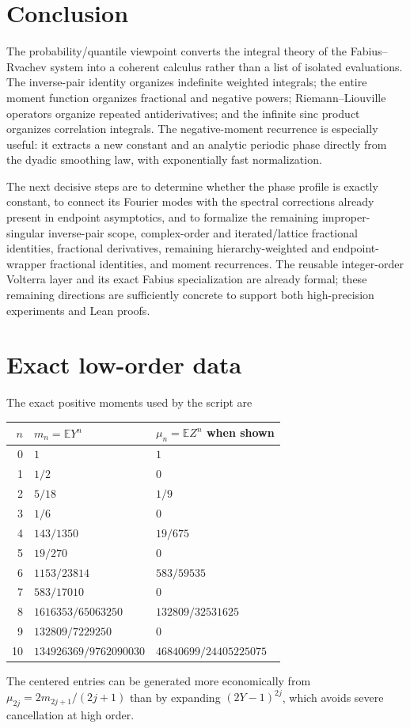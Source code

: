 \documentclass[11pt,oneside]{article}
\theoremstyle{definition}
\theoremstyle{remark}
\newcommand{\E}{\mathbb E}
\newcommand{\1}{\mathbf 1}
\begin{document}
\section{Conclusion}

The probability/quantile viewpoint converts the integral theory of the Fabius--Rvachev
system into a coherent calculus rather than a list of isolated evaluations.  The
inverse-pair identity organizes indefinite weighted integrals; the entire moment function
organizes fractional and negative powers; Riemann--Liouville operators organize repeated
antiderivatives; and the infinite sinc product organizes correlation integrals.  The
negative-moment recurrence is especially useful: it extracts a new constant and an
analytic periodic phase directly from the dyadic smoothing law, with exponentially fast
normalization.

The next decisive steps are to determine whether the phase profile is exactly constant,
to connect its Fourier modes with the spectral corrections already present in endpoint
asymptotics, and to formalize the remaining improper-singular inverse-pair scope,
complex-order and iterated/lattice fractional identities, fractional
derivatives, remaining hierarchy-weighted and endpoint-wrapper fractional identities, and
moment recurrences.
The reusable integer-order Volterra layer and its exact Fabius specialization are already
formal; these remaining directions are sufficiently concrete to support both
high-precision experiments and Lean proofs.

\appendix

\section{Exact low-order data}

The exact positive moments used by the script are
\begin{longtable}{@{}rll@{}}
\toprule
\(n\)&\(m_n=\E Y^n\)&\(\mu_n=\E Z^n\) when shown\\
\midrule
0&\(1\)&\(1\)\\
1&\(1/2\)&\(0\)\\
2&\(5/18\)&\(1/9\)\\
3&\(1/6\)&\(0\)\\
4&\(143/1350\)&\(19/675\)\\
5&\(19/270\)&\(0\)\\
6&\(1153/23814\)&\(583/59535\)\\
7&\(583/17010\)&\(0\)\\
8&\(1616353/65063250\)&\(132809/32531625\)\\
9&\(132809/7229250\)&\(0\)\\
10&\(134926369/9762090030\)&\(46840699/24405225075\)\\
\bottomrule
\end{longtable}
The centered entries can be generated more economically from
\(\mu_{2j}=2m_{2j+1}/(2j+1)\) than by expanding \((2Y-1)^{2j}\), which avoids severe
cancellation at high order.
\end{document}
